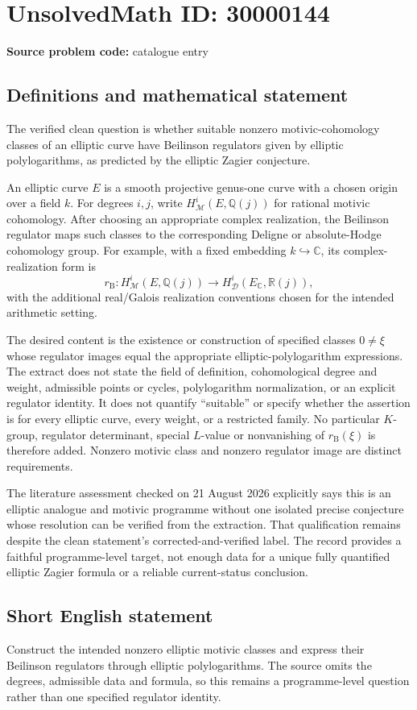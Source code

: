 \documentclass[11pt]{article}
\newcommand{\Q}{\mathbb{Q}}
\newcommand{\R}{\mathbb{R}}
\newcommand{\C}{\mathbb{C}}
\begin{document}
\section*{UnsolvedMath ID: 30000144}
\textbf{Source problem code:} catalogue entry
\subsection{Definitions and mathematical statement}
The verified clean question is whether suitable nonzero motivic-cohomology classes of an elliptic curve have Beilinson regulators given by elliptic polylogarithms, as predicted by the elliptic Zagier conjecture.

An elliptic curve $E$ is a smooth projective genus-one curve with a chosen origin over a field $k$. For degrees $i,j$, write $H^i_{\mathcal M}(E,\Q(j))$ for rational motivic cohomology. After choosing an appropriate complex realization, the Beilinson regulator maps such classes to the corresponding Deligne or absolute-Hodge cohomology group. For example, with a fixed embedding $k\hookrightarrow\C$, its complex-realization form is
\[
 r_{\mathrm B}:H^i_{\mathcal M}(E,\Q(j))
                 \longrightarrow H^i_{\mathcal D}(E_{\C},\R(j)),
\]
with the additional real/Galois realization conventions chosen for the intended arithmetic setting.

The desired content is the existence or construction of specified classes $0\ne\xi$ whose regulator images equal the appropriate elliptic-polylogarithm expressions. The extract does not state the field of definition, cohomological degree and weight, admissible points or cycles, polylogarithm normalization, or an explicit regulator identity. It does not quantify ``suitable'' or specify whether the assertion is for every elliptic curve, every weight, or a restricted family. No particular $K$-group, regulator determinant, special $L$-value or nonvanishing of $r_{\mathrm B}(\xi)$ is therefore added. Nonzero motivic class and nonzero regulator image are distinct requirements.

The literature assessment checked on 21 August 2026 explicitly says this is an elliptic analogue and motivic programme without one isolated precise conjecture whose resolution can be verified from the extraction. That qualification remains despite the clean statement's corrected-and-verified label. The record provides a faithful programme-level target, not enough data for a unique fully quantified elliptic Zagier formula or a reliable current-status conclusion.
\subsection{Short English statement}
Construct the intended nonzero elliptic motivic classes and express their Beilinson regulators through elliptic polylogarithms. The source omits the degrees, admissible data and formula, so this remains a programme-level question rather than one specified regulator identity.
\end{document}
